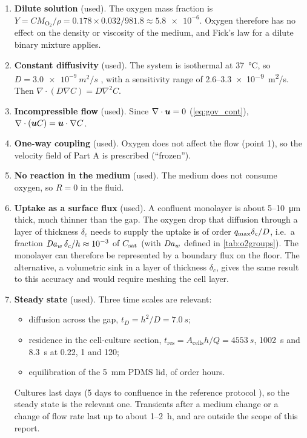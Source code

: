\begin{enumerate}
\item \textbf{Dilute solution} (used). The oxygen mass fraction is $Y=CM_{\mathrm{O_2}}/\rho=0.178\times0.032/981.8\approx\num{5.8e-6}$. Oxygen therefore has no effect on the density or viscosity of the medium, and Fick's law for a dilute binary mixture applies.
\item \textbf{Constant diffusivity} (used). The system is isothermal at \SI{37}{\celsius}, so $D=\SI{3.0e-9}{m^2/s}$ \citep{HanBartels1996}, with a sensitivity range of 2.6--\SI{3.3e-9}{m^2/s}. Then $\nabla\cdot(D\nabla C)=D\nabla^2C$.
\item \textbf{Incompressible flow} (used). Since $\nabla\cdot\bm{u}=0$ (\cref{eq:gov_cont}), $\nabla\cdot(\bm{u}C)=\bm{u}\cdot\nabla C$.
\item \textbf{One-way coupling} (used). Oxygen does not affect the flow (point 1), so the velocity field of Part A is prescribed (``frozen'').
\item \textbf{No reaction in the medium} (used). The medium does not consume oxygen, so $R=0$ in the fluid.
\item \textbf{Uptake as a surface flux} (used). A confluent monolayer is about 5--\SI{10}{\micro\metre} thick, much thinner than the gap. The oxygen drop that diffusion through a layer of thickness $\delta_c$ needs to supply the uptake is of order $q_{\max}\delta_c/D$, i.e.\ a fraction $\mathit{Da}_w\,\delta_c/h\approx10^{-3}$ of $C_{\mathrm{sat}}$ (with $\mathit{Da}_w$ defined in \cref{tab:o2groups}). The monolayer can therefore be represented by a boundary flux on the floor. The alternative, a volumetric sink in a layer of thickness $\delta_c$, gives the same result to this accuracy and would require meshing the cell layer.
\item \textbf{Steady state} (used). Three time scales are relevant:
\begin{itemize}
\item diffusion across the gap, $t_D=h^2/D=\SI{7.0}{s}$;
\item residence in the cell-culture section, $t_{\mathrm{res}}=A_{\mathrm{cells}}h/Q=\SI{4553}{s}$, \SI{1002}{s} and \SI{8.3}{s} at 0.22, 1 and \SI{120}{\uLmin};
\item equilibration of the \SI{5}{mm} PDMS lid, of order hours.
\end{itemize}
Cultures last days (5 days to confluence in the reference protocol \citep{Delon2020}), so the steady state is the relevant one. Transients after a medium change or a change of flow rate last up to about 1--\SI{2}{h}, and are outside the scope of this report.

\end{enumerate}

